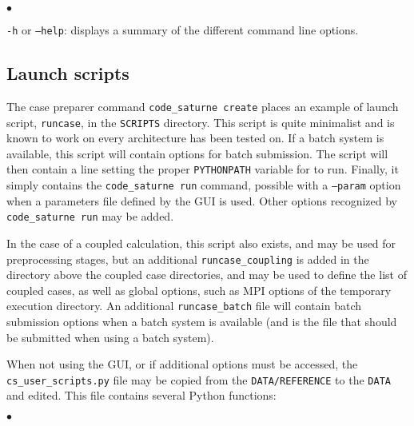 {{{{\begin{list}{$\bullet$}{}
\item \texttt{-h} or \texttt{--help}: displays a summary of the different
command line options.
\end{list}

\subsection{Launch scripts}
\label{sec:prg_runcase}%

The case preparer command \texttt{code\_saturne~create} places an example of launch script,
\texttt{runcase}, in the \texttt{SCRIPTS} directory. This script is quite minimalist and is known to work on every architecture \CS has been tested on.
If a batch system is available, this script will contain options
for batch submission.
The script will then contain a line setting the proper \texttt{PYTHONPATH}
variable for \CS to run.
Finally, it simply contains the \texttt{code\_saturne run}  command,
possible with a \texttt{--param} option when a parameters file
defined by the GUI is used. Other options recognized by
\texttt{code\_saturne run} may be added.

In the case of a coupled calculation, this script also exists, and
may be used for preprocessing stages, but an additional
\texttt{runcase\_coupling} is added in the directory above the coupled case
directories, and may be used to define the list of coupled cases,
as well as global options, such as MPI options of the temporary
execution directory. An additional \texttt{runcase\_batch} file will
contain batch submission options when a batch system is available
(and is the file that should be submitted when using a batch system).

When not using the GUI, or if additional options must be accessed,
the \texttt{cs\_user\_scripts.py} file may be copied from
the \texttt{DATA/REFERENCE} to the \texttt{DATA} and edited.
This file contains several Python functions:

\begin{list}{$\bullet$}{}


\end{list}}}}}
